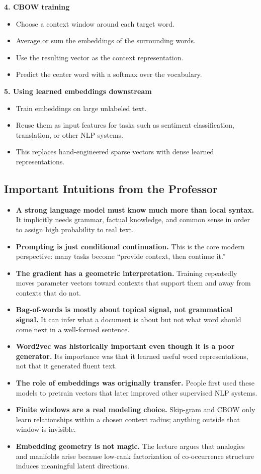 \documentclass[11pt]{article}
\begin{document}
\textbf{4. CBOW training}
\begin{itemize}
    \item Choose a context window around each target word.
    \item Average or sum the embeddings of the surrounding words.
    \item Use the resulting vector as the context representation.
    \item Predict the center word with a softmax over the vocabulary.
\end{itemize}

\textbf{5. Using learned embeddings downstream}
\begin{itemize}
    \item Train embeddings on large unlabeled text.
    \item Reuse them as input features for tasks such as sentiment classification, translation, or other NLP systems.
    \item This replaces hand-engineered sparse vectors with dense learned representations.
\end{itemize}

\subsection{Important Intuitions from the Professor}
\begin{itemize}
    \item \textbf{A strong language model must know much more than local syntax.} It implicitly needs grammar, factual knowledge, and common sense in order to assign high probability to real text.
    \item \textbf{Prompting is just conditional continuation.} This is the core modern perspective: many tasks become ``provide context, then continue it.''
    \item \textbf{The gradient has a geometric interpretation.} Training repeatedly moves parameter vectors toward contexts that support them and away from contexts that do not.
    \item \textbf{Bag-of-words is mostly about topical signal, not grammatical signal.} It can infer what a document is about but not what word should come next in a well-formed sentence.
    \item \textbf{Word2vec was historically important even though it is a poor generator.} Its importance was that it learned useful word representations, not that it generated fluent text.
    \item \textbf{The role of embeddings was originally transfer.} People first used these models to pretrain vectors that later improved other supervised NLP systems.
    \item \textbf{Finite windows are a real modeling choice.} Skip-gram and CBOW only learn relationships within a chosen context radius; anything outside that window is invisible.
    \item \textbf{Embedding geometry is not magic.} The lecture argues that analogies and manifolds arise because low-rank factorization of co-occurrence structure induces meaningful latent directions.
\end{itemize}
\end{document}
